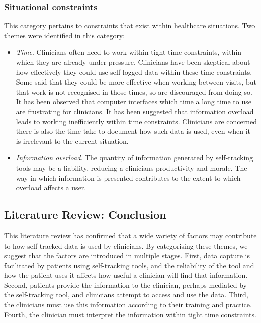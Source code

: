 \documentclass{sigchi}
\begin{document}
\subsubsection{Situational constraints}

This category pertains to constraints that exist within healthcare situations. Two themes were identified in this category:

\begin{itemize}
    \item \textit{Time}. Clinicians often need to work within tight time constraints, within which they are already under pressure. Clinicians have been skeptical about how effectively they could use self-logged data within these time constraints. Some said that they could be more effective when working between visits, but that work is not recognised in those times, so are discouraged from doing so. It has been observed that computer interfaces which time a long time to use are frustrating for clinicians. It has been suggested that information overload leads to working inefficiently within time constraints. Clinicians are concerned there is also the time take to document how such data is used, even when it is irrelevant to the current situation.
    
    \item \textit{Information overload}. The quantity of information generated by self-tracking tools may be a liability, reducing a clinicians productivity and morale. The way in which information is presented contributes to the extent to which overload affects a user.
    
\end{itemize}

\subsection{Literature Review: Conclusion}

This literature review has confirmed that a wide variety of factors may contribute to how self-tracked data is used by clinicians. By categorising these themes, we suggest that the factors are introduced in multiple stages. First, data capture is facilitated by patients using self-tracking tools, and the reliability of the tool and how the patient uses it affects how useful a clinician will find that information. Second, patients provide the information to the clinician, perhaps mediated by the self-tracking tool, and clinicians attempt to access and use the data. Third, the clinicians must use this information according to their training and practice. Fourth, the clinician must interpret the information within tight time constraints.
\end{document}
